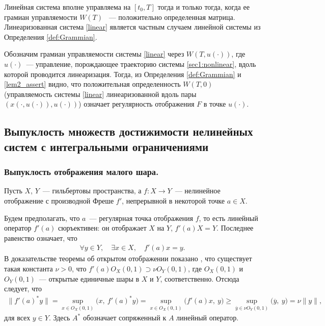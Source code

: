 \documentclass[../main.tex]{subfiles}
\begin{document}
	 Линейная система вполне управляема на  $ [t_0, T] $ тогда и только тогда, когда ее грамиан управляемости $W(T)$ ~--- положительно определенная матрица. Линеаризованная система \eqref{linear} является частным случаем линейной системы из Определения \ref{def:Grammian}. 
	 
	 Обозначим грамиан управляемости системы \eqref{linear} через $W(T,u(\cdot))$, где $u(\cdot)$~--- управление, порождающее траекторию системы \eqref{sec1:nonlinear}, вдоль которой проводится линеаризация. Тогда, из Определения \ref{def:Grammian} и \eqref{lem2_assert} видно, что положительная определенность $W(T,0)$ (управляемость системы \eqref{linear} линеаризованной вдоль пары $\left( x(\cdot,u(\cdot)),u(\cdot)\right)   $) означает регулярность отображения $F$ в точке $u(\cdot) $. 
	
	\subsection{Выпуклость множеств достижимости нелинейных систем с интегральными ограничениями}
	\subsubsection{Выпуклость отображения малого шара.}
	
	Пусть $X$, $Y$~--- гильбертовы пространства, а $f: X \rightarrow Y$~--- нелинейное отображение с производной Фреше $f'$, непрерывной в некоторой точке $a \in X$.
	
	Будем предполагать, что $a$~--- регулярная точка отображения $f$, то есть линейный оператор $f'(a)$ сюръективен: он отображает $X$ на $Y$, $ f'(a) X = Y $.  Последнее равенство означает, что 
	\begin{gather}\label{regularity_cond}
		\forall y \in Y, \quad \exists x \in X, \quad f'(a) x = y.
	\end{gather}
	В доказательстве теоремы об открытом отображении показано \cite[Теорема 2.11, Теорема 4.13]{Rudin}, что существует такая константа $\nu > 0$, что $f'(a) O_X(0, 1) \supset \nu O_Y(0, 1)$, где $ O_X(0, 1)$ и  $O_Y(0, 1)$~--- открытые единичные шары в $X$ и $Y$, соответственно. Отсюда следует, что
	\begin{gather}\label{LyusternikConditionProof}
		\| f'(a)^* y \| = \sup\limits_{x \in O_X(0, 1)} \big(x,\  f'(a)^* y\big) =  \sup\limits_{x \in O_X(0, 1)} \big(f'(a) x,\  y\big) \geqslant  \sup\limits_{\overline{y} \in \nu O_Y(0, 1)} \big(\overline{y},\  y\big) = \nu \|y\|,
	\end{gather}
	для всех $y \in Y$. Здесь $A^*$ обозначает сопряженный к $A$ линейный оператор.
	
\end{document}
